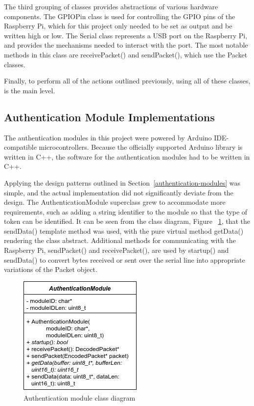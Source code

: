 \documentclass[12pt]{report}
\let\Oldsubsection\subsection
\renewcommand{\subsection}{\FloatBarrier\Oldsubsection}
\begin{document}
The third grouping of classes provides abstractions of various hardware components. The GPIOPin class is used for 
controlling the GPIO pins of the Raspberry Pi, which for this project only needed to be set as output and be written 
high or low. The Serial class represents a USB port on the Raspberry Pi, and provides the mechanisms needed to interact 
with the port. The most notable methods in this class are receivePacket() and sendPacket(), which use the Packet 
classes.

Finally, to perform all of the actions outlined previously, using all of these classes, is the main level.

\subsection{Authentication Module Implementations} \label{authentication-modules-implementations}

The authentication modules in this project were powered by Arduino IDE-compatible microcontrollers. Because the 
officially supported Arduino library is written in C++, the software for the authentication modules had to be written 
in C++.

Applying the design patterns outlined in Section~\ref{authentication-modules} was simple, and the actual implementation 
did not significantly deviate from the design. The AuthenticationModule superclass grew to accommodate more 
requirements, such as adding a string identifier to the module so that the type of token can be identified. It can be 
seen from the class diagram, Figure ~\ref{fig:authentication-module-class-diagram}, that the sendData() template method 
was used, with the pure virtual method getData() rendering the class abstract. Additional methods for communicating 
with the Raspberry Pi, sendPacket() and receivePacket(), are used by startup() and sendData() to convert bytes received 
or sent over the serial line into appropriate variations of the Packet object.

\begin{figure}
    \centering
    \includegraphics{Diagrams/Hardware-Diagrams/authenticationmodule_class}
    \caption{Authentication module class diagram}
    \label{fig:authentication-module-class-diagram}
\end{figure}
\end{document}
